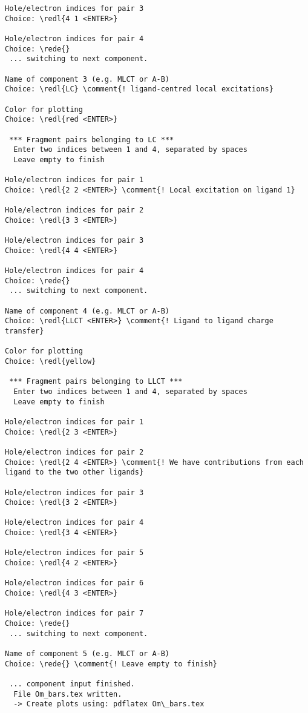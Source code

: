 \documentclass[DIV=12,headings=normal]{scrartcl}
\newcommand{\comment}[1]{\textcolor{blue}{#1}}
\newcommand{\redl}[1]{{\textcolor{red}{\underline{#1}}}}
\newcommand{\rede}[1]{\redl{#1 <ENTER>}}
\begin{document}
\begin{Verbatim}[commandchars=\\\{\}]
Hole/electron indices for pair 3
Choice: \redl{4 1 <ENTER>}

Hole/electron indices for pair 4
Choice: \rede{}
 ... switching to next component.

Name of component 3 (e.g. MLCT or A-B)
Choice: \redl{LC} \comment{! ligand-centred local excitations}

Color for plotting
Choice: \redl{red <ENTER>}

 *** Fragment pairs belonging to LC ***
  Enter two indices between 1 and 4, separated by spaces
  Leave empty to finish

Hole/electron indices for pair 1
Choice: \redl{2 2 <ENTER>} \comment{! Local excitation on ligand 1}

Hole/electron indices for pair 2
Choice: \redl{3 3 <ENTER>}

Hole/electron indices for pair 3
Choice: \redl{4 4 <ENTER>}

Hole/electron indices for pair 4
Choice: \rede{}
 ... switching to next component.
 
Name of component 4 (e.g. MLCT or A-B)
Choice: \redl{LLCT <ENTER>} \comment{! Ligand to ligand charge transfer}

Color for plotting
Choice: \redl{yellow}

 *** Fragment pairs belonging to LLCT ***
  Enter two indices between 1 and 4, separated by spaces
  Leave empty to finish

Hole/electron indices for pair 1
Choice: \redl{2 3 <ENTER>}

Hole/electron indices for pair 2
Choice: \redl{2 4 <ENTER>} \comment{! We have contributions from each ligand to the two other ligands}

Hole/electron indices for pair 3
Choice: \redl{3 2 <ENTER>}

Hole/electron indices for pair 4
Choice: \redl{3 4 <ENTER>}

Hole/electron indices for pair 5
Choice: \redl{4 2 <ENTER>}

Hole/electron indices for pair 6
Choice: \redl{4 3 <ENTER>}

Hole/electron indices for pair 7
Choice: \rede{}
 ... switching to next component.

Name of component 5 (e.g. MLCT or A-B)
Choice: \rede{} \comment{! Leave empty to finish}

 ... component input finished.
  File Om_bars.tex written.
  -> Create plots using: pdflatex Om\_bars.tex
\end{Verbatim}
\normalsize
\end{document}
